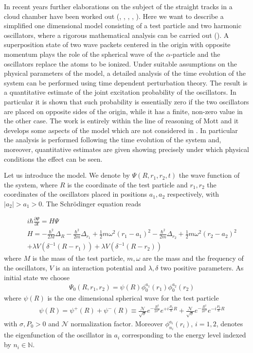 \documentclass[12pt,reqno]{amsart}
\newcommand{\natu}{\mathbb{N}}
\newcommand{\n}{\relax}
\newcommand{\vs}{\vspace{0.5cm}}
\newcommand{\f}{\frac}
\newcommand{\ba}{\begin{eqnarray}}
\newcommand{\ea}{\end{eqnarray}}
\numberwithin{equation}{section}
\begin{document}
\vs
\n
In recent years further elaborations on  the subject of the straight tracks in a cloud chamber  have been worked out (\cite{p}, \cite{br}, \cite{ccf}, \cite{cl}, \cite{ha}). Here we want to describe a simplified one dimensional model consisting of a test particle and two harmonic oscillators, where a rigorous mathematical analysis can be carried out (\cite{dft}). A superposition state of two wave packets centered in the origin with opposite momentum plays the role of the spherical wave of the $\alpha$-particle and the oscillators replace the atoms to be ionized.  Under suitable assumptions on the physical parameters of the model, a detailed analysis of the time evolution of the system can be performed using time dependent perturbation theory. The result is  a quantitative  estimate of the joint excitation probability of the oscillators. In particular it is shown   that such probability is essentially zero if the two oscillators 
are placed on  opposite sides of the origin, while it has a finite, non-zero value in the other case.  
The work is entirely within the line of reasoning of Mott and it develops  some aspects of the model which are not considered in \cite{m}.  In particular the analysis is performed following the time evolution of the system and, moreover, quantitative estimates are given showing precisely under which physical conditions the effect can be seen. 

\n
Let us introduce the model. We denote by $\Psi(R,r_1,r_2,t)$ the wave function of the system, where $R$ is the coordinate of the test particle and $r_1, r_2$ the coordinates of the oscillators placed in positions $a_1, a_2$ respectively, with $|a_2|>a_1>0$. The Schr\"{o}dinger equation reads 



\ba
&&i \hbar \f{\partial \Psi}{\partial t} = H \Psi \label{eq}\\
&&H= -\f{\hbar^2}{2M} \Delta_R \! -\! \f{\hbar^2}{2m} \Delta_{r_1} \! +\!\f{1}{2}m \omega^2 (r_1 \!-\! a_1)^2 \!-\! \f{\hbar^2}{2m} \Delta_{r_2} \!+\!\f{1}{2}m \omega^2 (r_2\! -\! a_2)^2 \label{H_0}\nonumber\\
&&+ \lambda V(\delta^{-1}(R-r_1)) + \lambda V(\delta^{-1}(R-r_2)) \label{H_1}
\ea
where $M$ is the mass of the test particle, $m, \omega$ are the mass and the frequency of the oscillators, $V$ is an interaction potential and $\lambda , \delta $ two positive parameters. As initial state  we choose 
\ba
&&  \Psi_0(R,r_1,r_2)= \psi(R) \phi^{a_1}_{0} (r_1) \phi^{a_2}_{0}(r_2) \label{statoin}
\ea
where  $\psi(R)$ is the one dimensional spherical wave for the test  particle
\ba
&&\psi(R)= \psi^{+}(R) + \psi^{-}(R)  \equiv    \f{\mathcal{N}}{\sqrt{\sigma}} e^{- \f{R^2}{2 \sigma^2}} e^{+ i \f{P_0}{\hbar} R}    +    \f{\mathcal{N}}{\sqrt{\sigma}} e^{- \f{R^2}{2 \sigma^2}} e^{- i \f{P_0}{\hbar} R} \label{p}
\ea
with $\sigma, P_0 >0$ and $\mathcal{N}$ normalization factor. Moreover $\phi_{n_i}^{a_i} (r_i)$, $i=1,2$, denotes the eigenfunction of the oscillator in $a_i$ corresponding to the energy level indexed by $n_i \in \natu$. 
\end{document}
